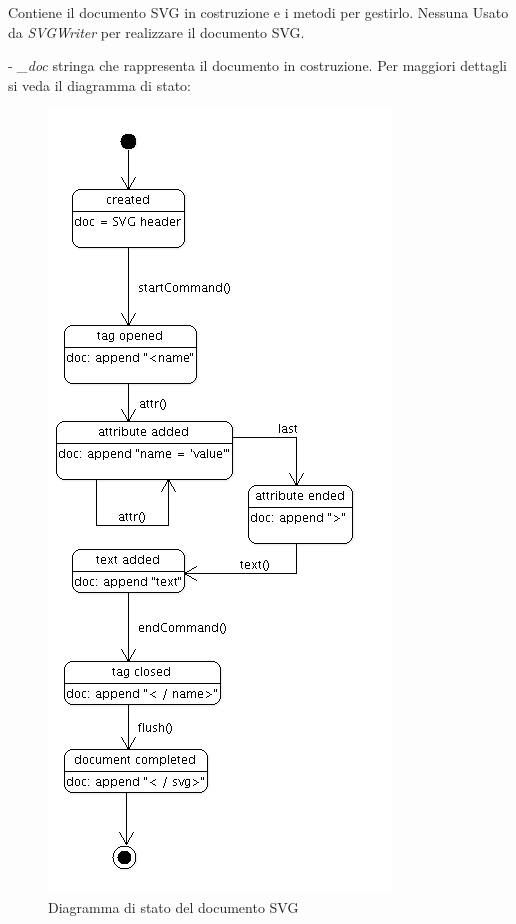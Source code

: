 Contiene il documento SVG in costruzione e i metodi per gestirlo.
Nessuna
Usato da \textit{SVGWriter} per realizzare il documento SVG.
\begin{elencopuntato}[\subsubsecindent]
\item[-] \textit{{\_}doc} stringa che rappresenta il documento in costruzione.
Per maggiori dettagli si veda il diagramma di stato: \newpage

\begin{figure}[!ht]
\centering
\includegraphics[scale=0.7]{svgdocument.png}
\caption{Diagramma di stato del documento SVG}
\end{figure}

\end{elencopuntato}
